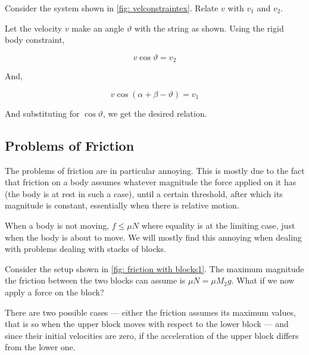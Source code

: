 \begin{example}
    Consider the system shown in \cref{fig: velconstraintex}. Relate \(v\) with
    \(v_1\) and \(v_2\).

\begin{soln}
        Let the velocity \(v\) make an angle \(\vartheta\) with the string as shown.
        Using the rigid body constraint,

        \begin{equation*}
            v\cos\vartheta = v_2
        \end{equation*}

        And,

        \begin{equation*}
            v\cos(\alpha+\beta-\vartheta) = v_1
        \end{equation*}

        And substituting for \(\cos\vartheta\), we get the desired relation.
    \end{soln}
\end{example}

\begin{marginfigure}
    \vspace{2em}
\end{marginfigure}

\subsection{Problems of Friction}

The problems of friction are in particular annoying. This is mostly due to 
the fact that friction on a body assumes whatever magnitude the force applied
on it has (the body is at rest in such a case), until a certain threshold, after which its magnitude is constant, essentially 
when there is relative motion.

When a body is not moving, \(f \le \mu N\) where equality is at the limiting case, 
just when the body is about to move. We will mostly find this annoying when dealing with 
problems dealing with stacks of blocks.


Consider the setup shown in \cref{fig: friction with blocks1}. The maximum magnitude the 
friction between the two blocks can assume is \(\mu N = \mu M_2g\). What if we now apply 
a force on the block? 

There are two possible cases --- either the friction assumes its maximum values, that is so when
the upper block moves with respect to the lower block --- and since their initial velocities
are zero, if the acceleration of the upper block differs from the lower one.

